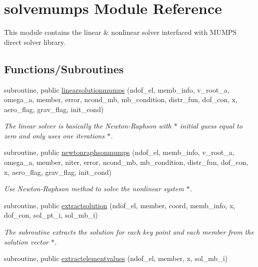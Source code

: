 \hypertarget{namespacesolvemumps}{}\section{solvemumps Module Reference}
\label{namespacesolvemumps}


This module contains the linear \& nonlinear solver interfaced with M\+U\+M\+PS direct solver library.  


\subsection*{Functions/\+Subroutines}
\begin{DoxyCompactItemize}
\item 
subroutine, public \hyperlink{namespacesolvemumps_aad7849d30a944c0bd614bf4e103ef494}{linearsolutionmumps} (ndof\+\_\+el, memb\+\_\+info, v\+\_\+root\+\_\+a, omega\+\_\+a, member, error, ncond\+\_\+mb, mb\+\_\+condition, distr\+\_\+fun, dof\+\_\+con, x, aero\+\_\+flag, grav\+\_\+flag, init\+\_\+cond)
\begin{DoxyCompactList}\small\item\em The linear solver is basically the Newton-\/\+Raphson with $\ast$ initial guess equal to zero and only uses one iterations $\ast$. \end{DoxyCompactList}\item 
subroutine, public \hyperlink{namespacesolvemumps_a243ff65847b437ecb22933d782df2db4}{newtonraphsonmumps} (ndof\+\_\+el, memb\+\_\+info, v\+\_\+root\+\_\+a, omega\+\_\+a, member, niter, error, ncond\+\_\+mb, mb\+\_\+condition, distr\+\_\+fun, dof\+\_\+con, x, aero\+\_\+flag, grav\+\_\+flag, init\+\_\+cond)
\begin{DoxyCompactList}\small\item\em Use Newton-\/\+Raphson method to solve the nonlinear system $\ast$. \end{DoxyCompactList}\item 
subroutine, public \hyperlink{namespacesolvemumps_aaa9b81bc0ea43f279abc42c729140761}{extractsolution} (ndof\+\_\+el, member, coord, memb\+\_\+info, x, dof\+\_\+con, sol\+\_\+pt\+\_\+i, sol\+\_\+mb\+\_\+i)
\begin{DoxyCompactList}\small\item\em The subroutine extracts the solution for each key point and each member from the solution vector $\ast$. \end{DoxyCompactList}\item 
subroutine, public \hyperlink{namespacesolvemumps_ae4f9a2e645ae55a030964764cf5b0218}{extractelementvalues} (ndof\+\_\+el, member, x, sol\+\_\+mb\+\_\+i)

\end{DoxyCompactItemize}
